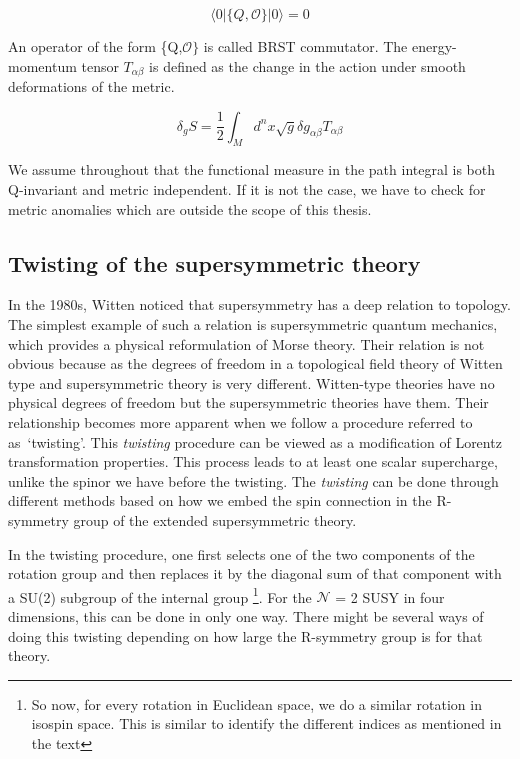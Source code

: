 \begin{itemize}
\begin{equation}
 \langle 0 | \{Q,\mathcal{O}\} | 0 \rangle  = 0 
 \end{equation}

An operator of the form \{Q,$\mathcal{O}\}$ is called BRST commutator. The energy-momentum tensor 
$T_{\alpha\beta}$ is defined as the change in the action under smooth deformations of the metric.


\begin{equation}
\delta_{g} S = \frac{1}{2} \int_{M} d^{n} x \sqrt{g} \delta g_{\alpha\beta} T_{\alpha\beta}
\end{equation}

We assume throughout that the functional measure in the path integral is both Q-invariant and metric
 independent. If it is not the case, we have to check for metric anomalies which are outside the scope of this thesis. 

\end{itemize} 


\subsection{Twisting of the supersymmetric theory}


In the 1980s, Witten noticed that supersymmetry has a deep relation to topology. 
The simplest example of such a relation is supersymmetric quantum mechanics, 
which provides a physical reformulation of Morse theory. 
Their relation is not obvious because as the degrees of freedom in a topological field theory of 
Witten type and supersymmetric theory is very different. 
Witten-type theories have no physical degrees of freedom but the supersymmetric theories have them. 
Their relationship becomes more apparent when we follow a procedure referred to as~`twisting'. 
This \textit{twisting} procedure can be viewed as a modification of Lorentz transformation properties. 
This process leads to at least one scalar supercharge, unlike the spinor we have before the twisting. 
The \textit{twisting} can be done through different methods based on how we embed the spin connection 
in the R-symmetry group of the extended supersymmetric theory. 

In the twisting procedure, one first selects one of the two components of the rotation group and 
then replaces it by the diagonal sum of that component with a SU(2) subgroup of the internal group 
\footnote{So now, for every rotation in Euclidean space, we do a similar rotation in isospin space. 
This is similar to identify the different indices as mentioned in the text}. For the $\mathcal{N}$ = 2 
SUSY in four dimensions, this can be done in only one way. There might be several ways of doing
this twisting depending on how large the R-symmetry group is for that theory.


